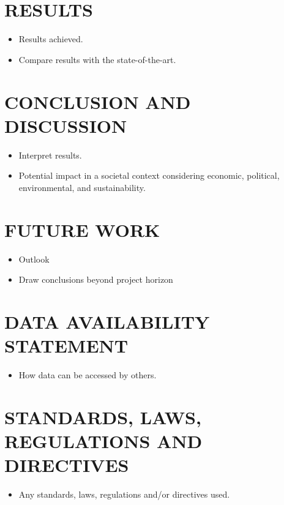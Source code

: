 \documentclass[a4paper,onesided,12pt]{report}
\begin{document}
\chapter{RESULTS}
\label{chapter:method}
\begin{itemize}
\item Results achieved.
\item Compare results with the state-of-the-art.
\end{itemize}

\chapter{CONCLUSION AND DISCUSSION}
\label{chapter:method}
\begin{itemize}
\item Interpret results.
\item Potential impact in a societal context considering economic, political, environmental, and sustainability.
\end{itemize}

\chapter{FUTURE WORK}
\label{chapter:method}
\begin{itemize}
\item Outlook
\item Draw conclusions beyond project horizon
\end{itemize}




\appendix
\chapter{DATA AVAILABILITY STATEMENT}
\begin{itemize}
\item How data can be accessed by others.
\end{itemize}


\chapter{STANDARDS, LAWS, REGULATIONS AND DIRECTIVES}
\begin{itemize}
\item Any standards, laws, regulations and/or directives used.
\end{itemize}
\end{document}
